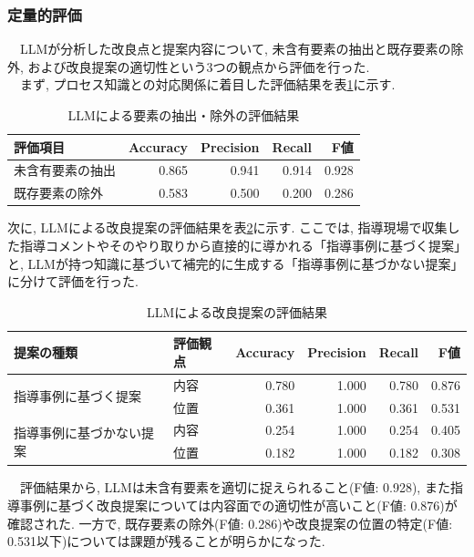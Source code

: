\subsubsection{定量的評価}
　LLMが分析した改良点と提案内容について, 未含有要素の抽出と既存要素の除外, および改良提案の適切性という3つの観点から評価を行った.\\
　まず, プロセス知識との対応関係に着目した評価結果を表\ref{table_llm_extraction}に示す.

\begin{table}[htbp]
    \centering
    \begin{tabular}{l|rrrr}
        \hline
        評価項目 & Accuracy & Precision & Recall & F値 \\ \hline
        未含有要素の抽出 & 0.865 & 0.941 & 0.914 & 0.928 \\
        既存要素の除外 & 0.583 & 0.500 & 0.200 & 0.286\\
        \hline
    \end{tabular}
    \caption{LLMによる要素の抽出・除外の評価結果}
    \label{table_llm_extraction}
\end{table}

次に, LLMによる改良提案の評価結果を表\ref{table_llm_proposal}に示す. ここでは, 指導現場で収集した指導コメントやそのやり取りから直接的に導かれる「指導事例に基づく提案」と, LLMが持つ知識に基づいて補完的に生成する「指導事例に基づかない提案」に分けて評価を行った.

\begin{table}[htbp]
    \centering
    \begin{tabular}{l|l|rrrr}
        \hline
        提案の種類 & 評価観点 & Accuracy & Precision & Recall & F値 \\ \hline
        \multirow{2}{*}{指導事例に基づく提案} & 内容 & 0.780 & 1.000 & 0.780 & 0.876 \\
        & 位置 & 0.361 & 1.000 & 0.361 & 0.531 \\ \hline
        \multirow{2}{*}{指導事例に基づかない提案} & 内容 & 0.254 & 1.000 & 0.254 & 0.405 \\
        & 位置 & 0.182 & 1.000 & 0.182 & 0.308\\
        \hline
    \end{tabular}
    \caption{LLMによる改良提案の評価結果}
    \label{table_llm_proposal}
\end{table}

　評価結果から, LLMは未含有要素を適切に捉えられること(F値: 0.928), また指導事例に基づく改良提案については内容面での適切性が高いこと(F値: 0.876)が確認された. 一方で, 既存要素の除外(F値: 0.286)や改良提案の位置の特定(F値: 0.531以下)については課題が残ることが明らかになった.

